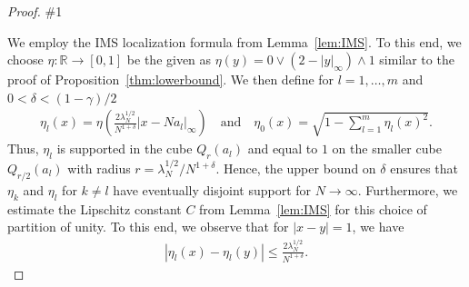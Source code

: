 \documentclass[10pt,a4paper]{amsart}
\newcommand{\R}{{\mathbb R}}
\newcommand{\lorenzorrection}[1]{\#1}%
\begin{document}
\begin{proof}
    \lorenzorrection{ As in the proof of  Proposition~\ref{thm:lowerbound}, the proof works again by induction on the energy level index $n\geq 0$. As above the base case $n=0$ can be obtained as a special case of the proof below without the inductive hypothesis. Suppose we have proved for all $m\leq n-1$ that\begin{equation*}
    E_m(H_N) \geq \lambda_Ne_{m}(V) + o(\lambda_N).
\end{equation*} We shall now prove that the statement holds true for $m=n$.} 

We employ the IMS localization formula from Lemma~\ref{lem:IMS}. 
    To this end, we choose 
      $ \eta :\R\to[0,1]$ be the given as $\eta(y) =0\vee(2-|y|_\infty )\wedge 1$ similar to the proof of Proposition~\ref{thm:lowerbound}. We then define for $l=1,\ldots,m$ and $0<\delta<(1-\gamma)/2$
    \begin{align*}
        \eta_l(x) = \eta\left(\frac{2\lambda_N^{1/2}}{N^{1+\delta}} |x - Na_l|_\infty \right)\quad\text{and}\quad
        \eta_0(x) = \sqrt{1-\sum_{l=1}^m \eta_l(x)^2}.
    \end{align*}
     Thus, $\eta_l$ is supported in the cube $Q_{r}(a_l)$ and equal to $1$ on the smaller cube $Q_{r/2}(a_l)$ with radius $r={\lambda_N^{1/2}}/{N^{1+\delta}} $.    
    Hence, the upper bound  on $\delta$ ensures that $\eta_k$ and $\eta_l$ for $k\neq l$ have eventually disjoint support for $N\to\infty$.
    Furthermore, we estimate the Lipschitz constant $C$ from Lemma~\ref{lem:IMS} for this choice of partition of unity. To this end, we observe that for $|x-y|=1$, we have
    \begin{align*}
        |\eta_l(x)-\eta_l(y)| %
        \leq \frac{2\lambda_N^{1/2}}{N^{1+\delta}}.
    \end{align*}


\end{proof}
\end{document}
